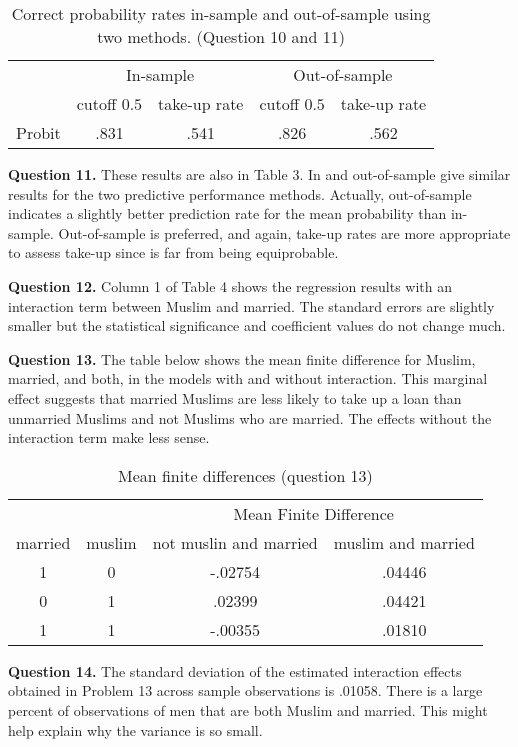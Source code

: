 \documentclass{article}
\theoremstyle{definition}
\begin{document}
\begin{table}[htbp]\centering
\begin{tabular}{rcccc}
	 & \multicolumn{2}{c}{In-sample}                & \multicolumn{2}{c}{Out-of-sample} \\
	 & cutoff $0.5$                & take-up rate     & cutoff $0.5$                & take-up rate  \\\hline
	\hline
	Probit      & .831& .541& .826 & .562\\
\end{tabular}
\caption{Correct probability rates in-sample and out-of-sample using two methods. (Question 10 and 11)}
\end{table}

\textbf{Question 11.} These results are also in Table 3. In and out-of-sample give similar results for the two predictive performance methods. Actually, out-of-sample indicates a slightly better prediction rate for the mean probability than in-sample. Out-of-sample is preferred, and again, take-up rates are more appropriate to assess take-up since 
is far from being equiprobable. 

\textbf{Question 12.} Column 1 of Table 4 shows the regression results with an interaction term between Muslim and married. The standard errors are slightly smaller but the statistical significance and coefficient values do not change much.  


\textbf{Question 13.} The table below shows the mean finite difference for Muslim, married, and both, in the models with and without interaction. This marginal effect suggests that married Muslims are less likely to take up a loan than unmarried Muslims and not Muslims who are married. The effects without the interaction term make less sense.

\begin{table}[htbp]\centering
\begin{tabular}{cc|cc}
	&&\multicolumn{2}{c}{\small{Mean Finite Difference}} \\
	married & muslim & not muslin and married &  muslim and married \\\hline
	1 & 0 & -.02754 & .04446 \\
	0 & 1 & .02399 & .04421 \\
	1 & 1 & -.00355 & .01810  \\
\end{tabular}
\caption{Mean finite differences (question 13)}
\end{table}

\textbf{Question 14.} 
The standard deviation of the estimated interaction effects obtained in Problem 13 across sample observations is .01058. There is a large percent of observations of men that are both Muslim and married. This might help explain why the variance is so small. 
\end{document}
